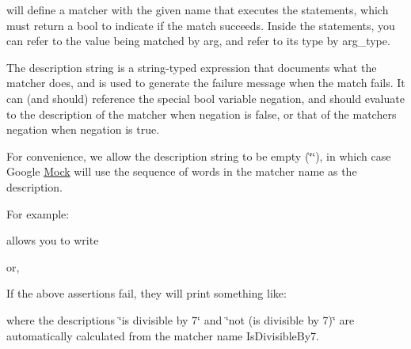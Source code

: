 will define a matcher with the given name that executes the statements, which must return a {\ttfamily bool} to indicate if the match succeeds. Inside the statements, you can refer to the value being matched by {\ttfamily arg}, and refer to its type by {\ttfamily arg\+\_\+type}.

The description string is a {\ttfamily string}-\/typed expression that documents what the matcher does, and is used to generate the failure message when the match fails. It can (and should) reference the special {\ttfamily bool} variable {\ttfamily negation}, and should evaluate to the description of the matcher when {\ttfamily negation} is {\ttfamily false}, or that of the matcher\textquotesingle{}s negation when {\ttfamily negation} is {\ttfamily true}.

For convenience, we allow the description string to be empty ({\ttfamily \char`\"{}\char`\"{}}), in which case Google \mbox{\hyperlink{class_mock}{Mock}} will use the sequence of words in the matcher name as the description.

For example\+: 
\begin{DoxyCode}{0}
\end{DoxyCode}
 allows you to write 
\begin{DoxyCode}{0}
\DoxyCodeLine{\textcolor{comment}{// Expects mock\_foo.Bar(n) to be called where n is divisible by 7.}}
\end{DoxyCode}
 or, 
\begin{DoxyCode}{0}
\end{DoxyCode}
 If the above assertions fail, they will print something like\+: 
\begin{DoxyCode}{0}
\end{DoxyCode}
 where the descriptions {\ttfamily \char`\"{}is divisible by 7\char`\"{}} and {\ttfamily \char`\"{}not (is divisible
by 7)\char`\"{}} are automatically calculated from the matcher name {\ttfamily Is\+Divisible\+By7}.

